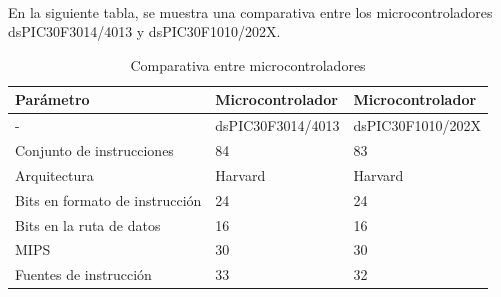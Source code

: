 \paragraph{}
En la siguiente tabla, se muestra una comparativa entre los microcontroladores dsPIC30F3014/4013 y dsPIC30F1010/202X.


\pagebreak
\begin{longtable}{|M{2.2cm}|M{6.0cm}|M{6.0cm}|}
    \caption{Comparativa entre microcontroladores}
	\hline
	\textbf{ Parámetro } & \textbf{Microcontrolador} & \textbf{Microcontrolador} \\ \hline
	
 	- & dsPIC30F3014/4013 & dsPIC30F1010/202X \\\hline
 	 
 	Conjunto de instrucciones  &
    84 & 83 \\ \hline
    Arquitectura   &
    Harvard & Harvard \\ \hline
    Bits en formato de instrucción  &
    24 & 24 \\ \hline
    Bits en la ruta de datos  &
    16 & 16 \\ \hline
    MIPS  &
    30 & 30 \\ \hline
    Fuentes de instrucción  &
    33 & 32 \\ \hline
    

\end{longtable}
